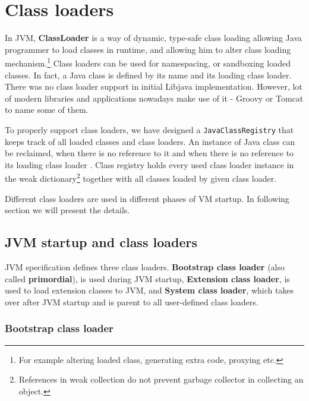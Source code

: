 \documentclass[11pt,twoside,a4paper]{book}
\newcommand{\libjava}{{Libjava}}
\begin{document}
\section{Class loaders}
\label{sec:class_loaders}

In JVM, \textbf{ClassLoader} is a way of dynamic, type-safe class loading allowing Java programmer to load classes in runtime, and allowing him to alter class loading mechanism.\footnote{For example altering loaded class, generating extra code, proxying etc.} 
Class loaders can be used for namespacing, or sandboxing loaded classes.\cite{bracha98}
In fact, a Java class is defined by its name and its loading class loader.\cite[section~5.3]{vmspec}
There was no class loader support in initial \libjava{} implementation. However, lot of modern libraries and applications
nowadays make use of it - Groovy or Tomcat to name some of them. 

To properly support class loaders, we have designed a \texttt{JavaClassRegistry} that keeps track of all loaded classes and class loaders. An instance of Java class can be reclaimed, when there is no reference to it and when there is no reference to its loading class loader \cite[section~12.7]{jls}. Class registry holds every used class loader instance in the weak dictionary\footnote{References in weak collection do not prevent garbage collector in collecting an object.} together with all classes loaded by given class loader.

Different class loaders are used in different phases of VM startup.
In following section we will present the details.

\subsection{JVM startup and class loaders}

JVM specification defines three class loaders. 
\textbf{Bootstrap class loader} (also called \textbf{primordial}),\cite[section~5.3.1]{vmspec} is used during JVM startup, \textbf{Extension class loader}, is used to load extension classes to JVM, and \textbf{System class loader}, which takes over after JVM startup and is parent to all user-defined class loaders.\cite[section~5.3.2]{vmspec}

\subsubsection{Bootstrap class loader}
\label{sec:bootstrap_cl}
\end{document}
